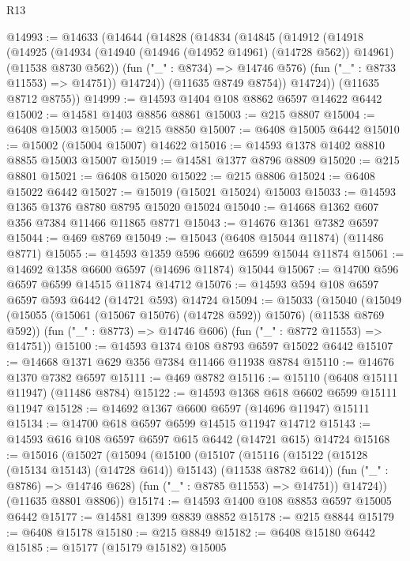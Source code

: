 \begin{lexlean}{R13}
\begin{coremodule}
@14993 := @14633
    (@14644
      (@14828
        (@14834
          (@14845
            (@14912
              (@14918
                (@14925
                  (@14934
                    (@14940 (@14946 (@14952 @14961) (@14728 @562)) @14961)
                    (@11538 @8730 @562))
                  (fun ("_" : @8734) => @14746 @576)
                  (fun ("_" : @8733 @11553) => @14751))
                @14724))
            (@11635 @8749 @8754))
          @14724))
      (@11635 @8712 @8755))
@14999 := @14593 @1404 @108 @8862 @6597 @14622 @6442
@15002 := @14581 @1403 @8856 @8861
@15003 := @215 @8807
@15004 := @6408 @15003
@15005 := @215 @8850
@15007 := @6408 @15005 @6442
@15010 := @15002 (@15004 @15007) @14622
@15016 := @14593 @1378 @1402 @8810 @8855 @15003 @15007
@15019 := @14581 @1377 @8796 @8809
@15020 := @215 @8801
@15021 := @6408 @15020
@15022 := @215 @8806
@15024 := @6408 @15022 @6442
@15027 := @15019 (@15021 @15024) @15003
@15033 := @14593 @1365 @1376 @8780 @8795 @15020 @15024
@15040 := @14668 @1362 @607 @356 @7384 @11466 @11865 @8771
@15043 := @14676 @1361 @7382 @6597
@15044 := @469 @8769
@15049 := @15043 (@6408 @15044 @11874) (@11486 @8771)
@15055 := @14593 @1359 @596 @6602 @6599 @15044 @11874
@15061 := @14692 @1358 @6600 @6597 (@14696 @11874) @15044
@15067 := @14700 @596 @6597 @6599 @14515 @11874 @14712
@15076 := @14593 @594 @108 @6597 @6597 @593 @6442 (@14721 @593) @14724
@15094 := @15033
    (@15040
      (@15049 (@15055 (@15061 (@15067 @15076) (@14728 @592)) @15076) (@11538 @8769 @592))
      (fun ("_" : @8773) => @14746 @606)
      (fun ("_" : @8772 @11553) => @14751))
@15100 := @14593 @1374 @108 @8793 @6597 @15022 @6442
@15107 := @14668 @1371 @629 @356 @7384 @11466 @11938 @8784
@15110 := @14676 @1370 @7382 @6597
@15111 := @469 @8782
@15116 := @15110 (@6408 @15111 @11947) (@11486 @8784)
@15122 := @14593 @1368 @618 @6602 @6599 @15111 @11947
@15128 := @14692 @1367 @6600 @6597 (@14696 @11947) @15111
@15134 := @14700 @618 @6597 @6599 @14515 @11947 @14712
@15143 := @14593 @616 @108 @6597 @6597 @615 @6442 (@14721 @615) @14724
@15168 := @15016
    (@15027
      (@15094
        (@15100
          (@15107
            (@15116 (@15122 (@15128 (@15134 @15143) (@14728 @614)) @15143) (@11538 @8782 @614))
            (fun ("_" : @8786) => @14746 @628)
            (fun ("_" : @8785 @11553) => @14751))
          @14724))
      (@11635 @8801 @8806))
@15174 := @14593 @1400 @108 @8853 @6597 @15005 @6442
@15177 := @14581 @1399 @8839 @8852
@15178 := @215 @8844
@15179 := @6408 @15178
@15180 := @215 @8849
@15182 := @6408 @15180 @6442
@15185 := @15177 (@15179 @15182) @15005

\end{coremodule}
\end{lexlean}
